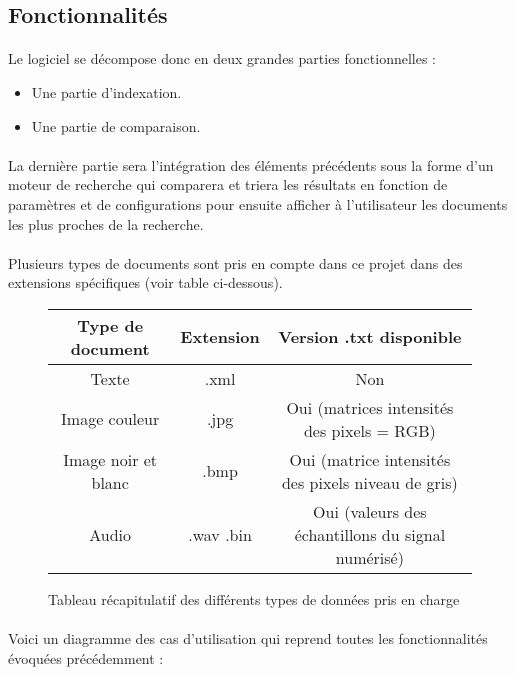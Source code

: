 \documentclass[../main.tex]{subfiles}
\begin{document}
\subsection{Fonctionnalités}
\paragraph{}
Le logiciel se décompose donc en deux grandes parties fonctionnelles :
\begin{itemize}
    \item Une partie d’indexation.
    \item Une partie de comparaison.
\end{itemize}

\paragraph{}
La dernière partie sera l'intégration des éléments précédents sous la forme d’un moteur de recherche qui comparera et triera les résultats en fonction de paramètres et de configurations pour ensuite afficher à l’utilisateur les documents les plus proches de la recherche.

\paragraph{}
Plusieurs types de documents sont pris en compte dans ce projet dans des extensions spécifiques (voir table ci-dessous).  	

\begin{figure}[h]
    \begin{center}
        \begin{tabular}{|c|c|c|}
            \hline
            \rowcolor{Gray}Type de document & Extension & Version .txt disponible \\
            \hline
            Texte & .xml & Non \\
            \hline
            Image couleur & .jpg & Oui (matrices intensités des pixels = RGB) \\
            \hline
            Image noir et blanc & .bmp & Oui (matrice intensités des pixels niveau de gris) \\
            \hline
            Audio & .wav .bin &  Oui (valeurs des échantillons du signal numérisé) \\
            \hline
        \end{tabular}
    \end{center}
    \caption{Tableau récapitulatif des différents types de données pris en charge}
\end{figure}

\paragraph{}
Voici un diagramme des cas d’utilisation qui reprend toutes les fonctionnalités évoquées précédemment : 
\end{document}
